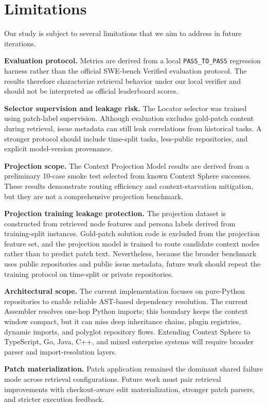\section{Limitations}
\label{sec:limitations}

Our study is subject to several limitations that we aim to address in future iterations.

\textbf{Evaluation protocol.} Metrics are derived from a local \texttt{PASS\_TO\_PASS} regression harness rather than the official SWE-bench Verified evaluation protocol. The results therefore characterize retrieval behavior under our local verifier and should not be interpreted as official leaderboard scores.

\textbf{Selector supervision and leakage risk.} The Locator selector was trained using patch-label supervision. Although evaluation excludes gold-patch content during retrieval, issue metadata can still leak correlations from historical tasks. A stronger protocol should include time-split tasks, less-public repositories, and explicit model-version provenance.

\textbf{Projection scope.} The Context Projection Model results are derived from a preliminary 10-case smoke test selected from known Context Sphere successes. These results demonstrate routing efficiency and context-starvation mitigation, but they are not a comprehensive projection benchmark.

\textbf{Projection training leakage protection.} The projection dataset is constructed from retrieved node features and persona labels derived from training-split instances. Gold-patch solution code is excluded from the projection feature set, and the projection model is trained to route candidate context nodes rather than to predict patch text. Nevertheless, because the broader benchmark uses public repositories and public issue metadata, future work should repeat the training protocol on time-split or private repositories.

\textbf{Architectural scope.} The current implementation focuses on pure-Python repositories to enable reliable AST-based dependency resolution. The current Assembler resolves one-hop Python imports; this boundary keeps the context window compact, but it can miss deep inheritance chains, plugin registries, dynamic imports, and polyglot repository flows. Extending Context Sphere to TypeScript, Go, Java, C++, and mixed enterprise systems will require broader parser and import-resolution layers.

\textbf{Patch materialization.} Patch application remained the dominant shared failure mode across retrieval configurations. Future work must pair retrieval improvements with checkout-aware edit materialization, stronger patch parsers, and stricter execution feedback.
